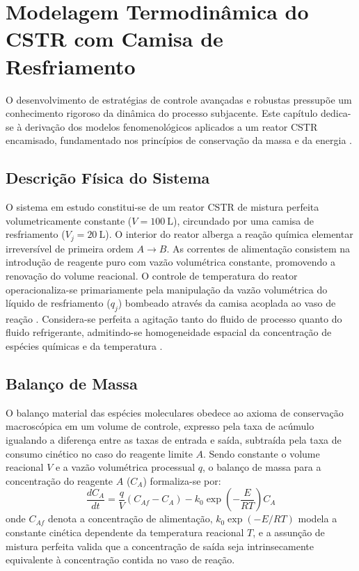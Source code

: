 \chapter{Modelagem Termodinâmica do CSTR com Camisa de Resfriamento}
\label{cap:modelagem}

O desenvolvimento de estratégias de controle avançadas e robustas pressupõe um conhecimento rigoroso da dinâmica do processo subjacente. Este capítulo dedica-se à derivação dos modelos fenomenológicos aplicados a um reator CSTR encamisado, fundamentado nos princípios de conservação da massa e da energia \cite{Fogler2016, Seborg2016}.

\section{Descrição Física do Sistema}
\label{sec:descricao_fisica}

O sistema em estudo constitui-se de um reator CSTR de mistura perfeita volumetricamente constante ($V = 100\ \si{\liter}$), circundado por uma camisa de resfriamento ($V_j = 20\ \si{\liter}$). O interior do reator alberga a reação química elementar irreversível de primeira ordem $A \to B$. As correntes de alimentação consistem na introdução de reagente puro com vazão volumétrica constante, promovendo a renovação do volume reacional. O controle de temperatura do reator operacionaliza-se primariamente pela manipulação da vazão volumétrica do líquido de resfriamento ($q_j$) bombeado através da camisa acoplada ao vaso de reação \cite{Bequette2003, Luyben2007}. Considera-se perfeita a agitação tanto do fluido de processo quanto do fluido refrigerante, admitindo-se homogeneidade espacial da concentração de espécies químicas e da temperatura \cite{Smith2005}.

\section{Balanço de Massa}
\label{sec:balanco_massa}

O balanço material das espécies moleculares obedece ao axioma de conservação macroscópica em um volume de controle, expresso pela taxa de acúmulo igualando a diferença entre as taxas de entrada e saída, subtraída pela taxa de consumo cinético no caso do reagente limite $A$. Sendo constante o volume reacional $V$ e a vazão volumétrica processual $q$, o balanço de massa para a concentração do reagente $A$ ($C_A$) formaliza-se por:
\begin{equation}
\label{eq:balanco_massa}
\frac{dC_A}{dt} = \frac{q}{V}(C_{Af} - C_A) - k_0 \exp\left(-\frac{E}{RT}\right) C_A
\end{equation}
onde $C_{Af}$ denota a concentração de alimentação, $k_0 \exp(-E/RT)$ modela a constante cinética dependente da temperatura reacional $T$, e a assunção de mistura perfeita valida que a concentração de saída seja intrinsecamente equivalente à concentração contida no vaso de reação.

